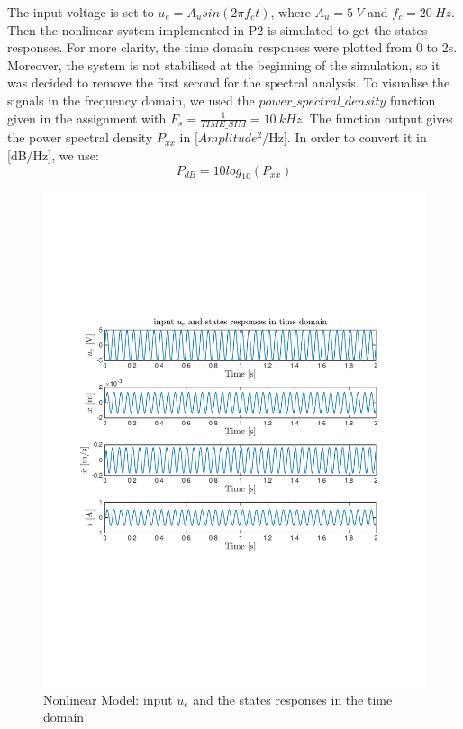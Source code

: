 The input voltage is set to $u_e = A_u sin(2\pi f_c t)$, where $A_u = 5 \ V$ and $f_c = 20 \ Hz$.
Then the nonlinear system implemented in P2 is simulated to get the states responses. For more clarity, the time domain responses were plotted from 0 to 2s. Moreover, the system is not stabilised at the beginning of the simulation, so it was decided to remove the first second for the spectral analysis. To visualise the signals in the frequency domain, we used the \textit{$power\_spectral\_density$} function given in the assignment \cite{assign} with $F_s = \frac{1}{TIME\_SIM} = 10 \ kHz$. The function output gives the power spectral density $P_{xx}$ in [$Amplitude^2$/Hz]. In order to convert it in [dB/Hz], we use: 
\begin{equation*}
P_{dB} = 10log_{10}(P_{xx})
\end{equation*} 

\begin{figure}[H]
 \centering 
 \includegraphics[trim=2cm 7cm 2cm 7cm, clip=true, totalheight=0.35\textheight, angle=0]{figures/P3timeDomain.pdf}
 \caption{Nonlinear Model: input $u_e$ and the states responses in the time domain}
 \label{fig:NLMt}
\end{figure}

